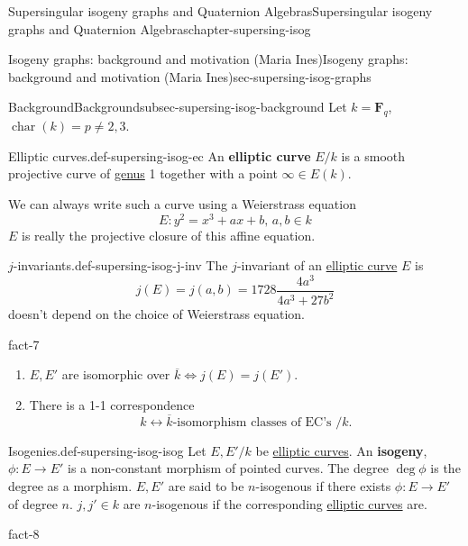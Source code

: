 \documentclass[oneside,10pt,]{book}
\newcommand{\terminology}[1]{\textbf{#1}}
\numberwithin{equation}{section}
\newcommand{\FF}{\mathbf{F}}
\DeclareMathOperator{\characteristic}{char}
\begin{document}
\begin{chapterptx}{Supersingular isogeny graphs and Quaternion Algebras}{}{Supersingular isogeny graphs and Quaternion Algebras}{}{}{chapter-supersing-isog}
\begin{sectionptx}{Isogeny graphs: background and motivation (Maria Ines)}{}{Isogeny graphs: background and motivation (Maria Ines)}{}{}{sec-supersing-isog-graphs}
\begin{subsectionptx}{Background}{}{Background}{}{}{subsec-supersing-isog-background}
\hypertarget{p-786}{}%
Let \(k = \FF_q\), \(\characteristic (k) = p \ne 2,3\).%
\begin{definition}{Elliptic curves.}{def-supersing-isog-ec}%
\hypertarget{p-787}{}%
An \terminology{elliptic curve} \(E/k\) is a smooth projective curve of \hyperref[def-class-set]{genus} 1 together with a point \(\infty \in E(k)\).%
\end{definition}
\hypertarget{p-788}{}%
We can always write such a curve using a Weierstrass equation%
\begin{equation*}
E\colon y^2=  x^3  + ax  +b,\,a,b    \in k
\end{equation*}
\(E\) is really the projective closure of this affine equation.%
\begin{definition}{\(j\)-invariants.}{def-supersing-isog-j-inv}%
\hypertarget{p-789}{}%
The \(j\)-invariant of an \hyperref[def-supersing-isog-ec]{elliptic curve} \(E\) is%
\begin{equation*}
j(E) = j(a,b) = 1728 \frac{4a^3}{4a^3 + 27b^2}
\end{equation*}
doesn't depend on the choice of Weierstrass equation.%
\end{definition}
\begin{fact}{}{}{fact-7}%
\hypertarget{p-790}{}%
\leavevmode%
\begin{enumerate}
\item\hypertarget{li-182}{}\(E,E'\) are isomorphic over \(\overline k \iff j(E)  = j(E')\).%
\item\hypertarget{li-183}{}There is a 1-1 correspondence%
\begin{equation*}
k \leftrightarrow \overline k \text{-isomorphism classes of EC's }/k\text{.}
\end{equation*}
%
\end{enumerate}
%
\end{fact}
\begin{definition}{Isogenies.}{def-supersing-isog-isog}%
\hypertarget{p-791}{}%
Let \(E,E'/k\) be \hyperref[def-supersing-isog-ec]{elliptic curves}. An \terminology{isogeny}, \(\phi \colon E\to E'\) is a non-constant morphism of pointed curves. The degree \(\deg \phi \) is the degree as a morphism. \(E,E'\) are said to be \(n\)-isogenous if there exists \(\phi\colon E\to E'\) of degree \(n\). \(j,j'\in k\) are \(n\)-isogenous if the corresponding \hyperref[def-supersing-isog-ec]{elliptic curves} are.%
\end{definition}
\begin{fact}{}{}{fact-8}%
\hypertarget{p-792}{}%
\leavevmode%

\end{fact}
\end{subsectionptx}
\end{sectionptx}
\end{chapterptx}
\end{document}
